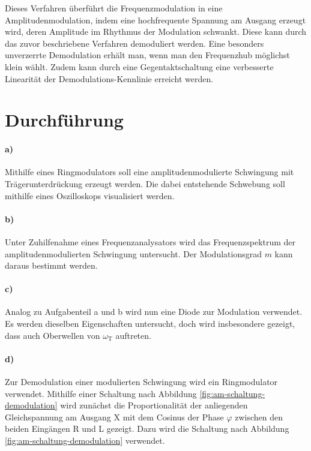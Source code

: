 Dieses Verfahren überführt die Frequenzmodulation in eine Amplitudenmodulation, indem eine hochfrequente Spannung am Ausgang erzeugt wird, deren Amplitude im Rhythmus der Modulation schwankt.
Diese kann durch das zuvor beschriebene Verfahren demoduliert werden.
Eine besonders unverzerrte Demodulation erhält man, wenn man den Frequenzhub möglichst klein wählt.
Zudem kann durch eine Gegentaktschaltung eine verbesserte Linearität der Demodulations-Kennlinie erreicht werden.

\section{Durchführung}
\label{sec:durchführung}

\paragraph{a)}
Mithilfe eines Ringmodulators soll eine amplitudenmodulierte Schwingung mit Trägerunterdrückung erzeugt werden.
Die dabei entstehende Schwebung soll mithilfe eines Oszilloskops visualisiert werden.

\paragraph{b)}
Unter Zuhilfenahme eines Frequenzanalysators wird das Frequenzspektrum der amplitudenmodulierten Schwingung untersucht.
Der Modulationsgrad $m$ kann daraus bestimmt werden.

\paragraph{c)}
Analog zu Aufgabenteil a und b wird nun eine Diode zur Modulation verwendet.
Es werden dieselben Eigenschaften untersucht, doch wird insbesondere gezeigt, dass auch Oberwellen von $\omega_\text{T}$ auftreten.

\paragraph{d)}
\label{par:d_}
Zur Demodulation einer modulierten Schwingung wird ein Ringmodulator verwendet.
Mithilfe einer Schaltung nach Abbildung \ref{fig:am-schaltung-demodulation} wird zunächst die Proportionalität der anliegenden Gleichspannung am Ausgang X mit dem Cosinus der Phase $\varphi$ zwischen den beiden Eingängen R und L gezeigt.
Dazu wird die Schaltung nach Abbildung \ref{fig:am-schaltung-demodulation} verwendet.

